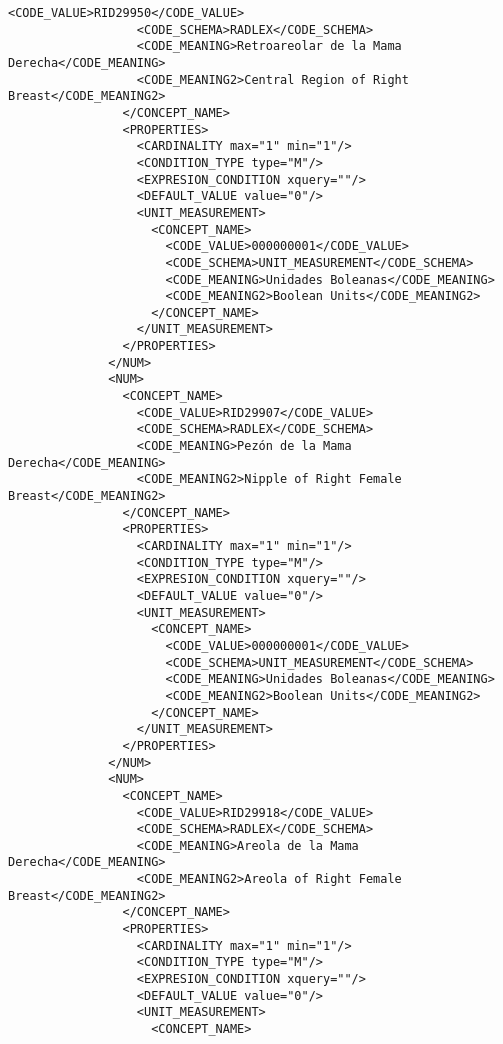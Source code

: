 \begin{lstlisting}[label=some-code,caption=Some Code]
                  <CODE_VALUE>RID29950</CODE_VALUE>
                  <CODE_SCHEMA>RADLEX</CODE_SCHEMA>
                  <CODE_MEANING>Retroareolar de la Mama Derecha</CODE_MEANING>
                  <CODE_MEANING2>Central Region of Right Breast</CODE_MEANING2>
                </CONCEPT_NAME>
                <PROPERTIES>
                  <CARDINALITY max="1" min="1"/>
                  <CONDITION_TYPE type="M"/>
                  <EXPRESION_CONDITION xquery=""/>
                  <DEFAULT_VALUE value="0"/>
                  <UNIT_MEASUREMENT>
                    <CONCEPT_NAME>
                      <CODE_VALUE>000000001</CODE_VALUE>
                      <CODE_SCHEMA>UNIT_MEASUREMENT</CODE_SCHEMA>
                      <CODE_MEANING>Unidades Boleanas</CODE_MEANING>
                      <CODE_MEANING2>Boolean Units</CODE_MEANING2>
                    </CONCEPT_NAME>
                  </UNIT_MEASUREMENT>
                </PROPERTIES>
              </NUM>
              <NUM>
                <CONCEPT_NAME>
                  <CODE_VALUE>RID29907</CODE_VALUE>
                  <CODE_SCHEMA>RADLEX</CODE_SCHEMA>
                  <CODE_MEANING>Pezón de la Mama Derecha</CODE_MEANING>
                  <CODE_MEANING2>Nipple of Right Female Breast</CODE_MEANING2>
                </CONCEPT_NAME>
                <PROPERTIES>
                  <CARDINALITY max="1" min="1"/>
                  <CONDITION_TYPE type="M"/>
                  <EXPRESION_CONDITION xquery=""/>
                  <DEFAULT_VALUE value="0"/>
                  <UNIT_MEASUREMENT>
                    <CONCEPT_NAME>
                      <CODE_VALUE>000000001</CODE_VALUE>
                      <CODE_SCHEMA>UNIT_MEASUREMENT</CODE_SCHEMA>
                      <CODE_MEANING>Unidades Boleanas</CODE_MEANING>
                      <CODE_MEANING2>Boolean Units</CODE_MEANING2>
                    </CONCEPT_NAME>
                  </UNIT_MEASUREMENT>
                </PROPERTIES>
              </NUM>
              <NUM>
                <CONCEPT_NAME>
                  <CODE_VALUE>RID29918</CODE_VALUE>
                  <CODE_SCHEMA>RADLEX</CODE_SCHEMA>
                  <CODE_MEANING>Areola de la Mama Derecha</CODE_MEANING>
                  <CODE_MEANING2>Areola of Right Female Breast</CODE_MEANING2>
                </CONCEPT_NAME>
                <PROPERTIES>
                  <CARDINALITY max="1" min="1"/>
                  <CONDITION_TYPE type="M"/>
                  <EXPRESION_CONDITION xquery=""/>
                  <DEFAULT_VALUE value="0"/>
                  <UNIT_MEASUREMENT>
                    <CONCEPT_NAME>

\end{lstlisting}

